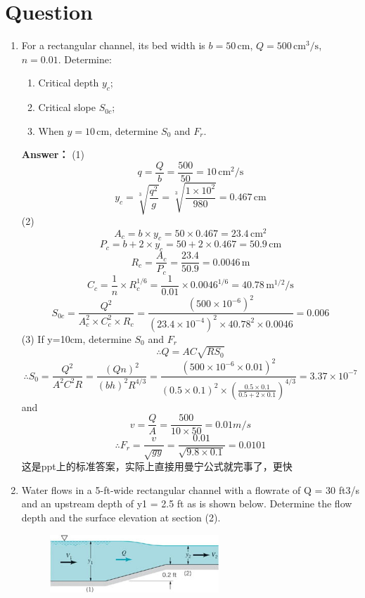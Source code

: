 \documentclass[12pt,a4paper]{article}
\newcounter{question}
\newenvironment{questions}{
    \setcounter{question}{0}
    \section*{Question}
    \begin{enumerate}[leftmargin=1.5em,label={\arabic*．}]
}{
    \end{enumerate}
}
\newcommand{\answer}[1]{\par\noindent\textbf{Answer：} #1\par\vspace{1em}}
\begin{document}
\begin{questions}
\item For a rectangular channel, its bed width is $b=50\,\mathrm{cm}$, $Q=500\,\mathrm{cm}^3/\mathrm{s}$, $n=0.01$. Determine: 
\begin{enumerate}
  \item Critical depth $y_c$;
  \item Critical slope $S_{0c}$;
  \item When $y=10\,\mathrm{cm}$, determine $S_0$ and $F_r$.
\end{enumerate}

\answer{
(1) 
\[
q = \frac{Q}{b} = \frac{500}{50} = 10\,\mathrm{cm}^2/\mathrm{s}
\]
\[
y_c = \sqrt[3]{\frac{q^2}{g}} = \sqrt[3]{\frac{1 \times 10^2}{980}} = 0.467\,\mathrm{cm}
\]
(2) 
\[
A_c = b \times y_c = 50 \times 0.467 = 23.4\,\mathrm{cm}^2
\]
\[
P_c = b + 2 \times y_c = 50 + 2 \times 0.467 = 50.9\,\mathrm{cm}
\]
\[
R_c = \frac{A_c}{P_c} = \frac{23.4}{50.9} = 0.0046\,\mathrm{m}
\]
\[
C_c = \frac{1}{n} \times R_c^{1/6} = \frac{1}{0.01} \times 0.0046^{1/6} = 40.78\,\mathrm{m}^{1/2}/\mathrm{s}
\]
\[
S_{0c} = \frac{Q^2}{A_c^2 \times C_c^2 \times R_c} = \frac{(500 \times 10^{-6})^2}{(23.4 \times 10^{-4})^2 \times 40.78^2 \times 0.0046} = 0.006
\]
(3) If y=10cm, determine \( S_0 \) and \( F_r \)
\[
\therefore Q = AC\sqrt{RS_0}
\]
\[
\therefore S_0 = \frac{Q^2}{A^2C^2R} = \frac{(Qn)^2}{(bh)^2R^{4/3}} = \frac{(500 \times 10^{-6} \times 0.01)^2}{(0.5 \times 0.1)^2 \times \left(\frac{0.5 \times 0.1}{0.5 + 2 \times 0.1}\right)^{4/3}} = 3.37 \times 10^{-7}
\]
and
\[
v = \frac{Q}{A} = \frac{500}{10 \times 50} = 0.01 m/s
\]
\[
\therefore F_r = \frac{v}{\sqrt{gy}} = \frac{0.01}{\sqrt{9.8 \times 0.1}} = 0.0101
\]
这是ppt上的标准答案，实际上直接用曼宁公式就完事了，更快

\item Water flows in a 5-ft-wide rectangular channel with a flowrate of Q = 30 ft3/s and an upstream depth of y1 = 2.5 ft as is shown below. Determine the flow depth and the surface elevation at section (2). 

\begin{figure}[H]
\centering
\includegraphics[width=0.6\textwidth]{./figures/30.png}
\end{figure}

}
\end{questions}
\end{document}

